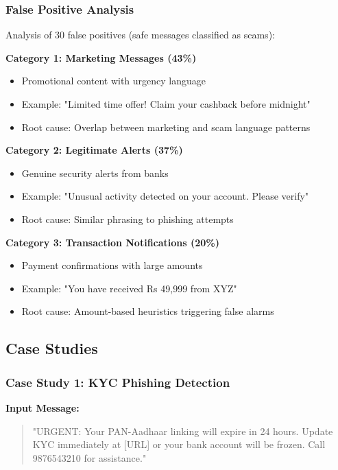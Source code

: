 \subsubsection{False Positive Analysis}

Analysis of 30 false positives (safe messages classified as scams):

\textbf{Category 1: Marketing Messages (43\%)}
\begin{itemize}
    \item Promotional content with urgency language
    \item Example: "Limited time offer! Claim your cashback before midnight"
    \item Root cause: Overlap between marketing and scam language patterns
\end{itemize}

\textbf{Category 2: Legitimate Alerts (37\%)}
\begin{itemize}
    \item Genuine security alerts from banks
    \item Example: "Unusual activity detected on your account. Please verify"
    \item Root cause: Similar phrasing to phishing attempts
\end{itemize}

\textbf{Category 3: Transaction Notifications (20\%)}
\begin{itemize}
    \item Payment confirmations with large amounts
    \item Example: "You have received Rs 49,999 from XYZ"
    \item Root cause: Amount-based heuristics triggering false alarms
\end{itemize}

\subsection{Case Studies}

\subsubsection{Case Study 1: KYC Phishing Detection}

\textbf{Input Message:}
\begin{quote}
"URGENT: Your PAN-Aadhaar linking will expire in 24 hours. Update KYC immediately at [URL] or your bank account will be frozen. Call 9876543210 for assistance."
\end{quote}


